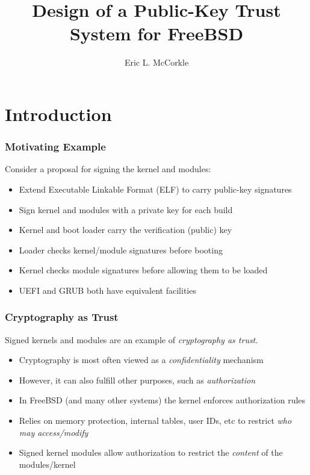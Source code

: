 \documentclass{beamer}
\title{Design of a Public-Key Trust System for FreeBSD}
\author{Eric L. McCorkle}
\begin{document}
\begin{frame}
  \titlepage{}
\end{frame}

\section{Introduction}

\begin{frame}
  \frametitle{Motivating Example}
  Consider a proposal for signing the kernel and modules:
  \begin{itemize}
  \item Extend Executable Linkable Format (ELF) to carry public-key
    signatures
  \item Sign kernel and modules with a private key for each build
  \item Kernel and boot loader carry the verification (public) key
  \item Loader checks kernel/module signatures before booting
  \item Kernel checks module signatures before allowing them to be loaded
  \item UEFI and GRUB both have equivalent facilities
  \end{itemize}
\end{frame}

\begin{frame}
  \frametitle{Cryptography as Trust}

  Signed kernels and modules are an example of \emph{cryptography as
    trust}.
  \begin{itemize}
  \item Cryptography is most often viewed as a \emph{confidentiality}
    mechanism
  \item However, it can also fulfill other purposes, such as
    \emph{authorization}
  \item In FreeBSD (and many other systems) the kernel
    enforces authorization rules
  \item Relies on memory protection, internal tables, user IDs, etc to
    restrict \emph{who may access/modify}
  \item Signed kernel modules allow authorization to restrict the
    \emph{content} of the modules/kernel
  \end{itemize}
\end{frame}
\end{document}
